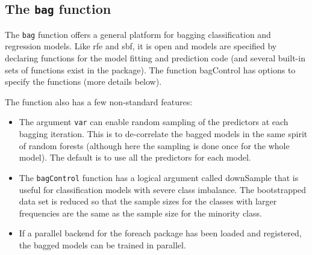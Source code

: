\documentclass[caret-main.tex]{subfiles}
\begin{document}
\newpage
\subsection{The \texttt{bag} function}

The \texttt{bag} function offers a general platform for bagging classification and regression models. Like rfe and sbf, it is open and models are specified by declaring functions for the model fitting and prediction code (and several built-in sets of functions exist in the package). The function bagControl has options to specify the functions (more details below).

The function also has a few non-standard features:

\begin{itemize}
\item The argument \texttt{var} can enable random sampling of the predictors at each bagging iteration. This is to de-correlate the bagged models in the same spirit of random forests (although here the sampling is done once for the whole model). The default is to use all the predictors for each model.
\item The \texttt{bagControl} function has a logical argument called downSample that is useful for classification models with severe class imbalance. The bootstrapped data set is reduced so that the sample sizes for the classes with larger frequencies are the same as the sample size for the minority class.
\item If a parallel backend for the foreach package has been loaded and registered, the bagged models can be trained in parallel.
\end{itemize}
\end{document}
